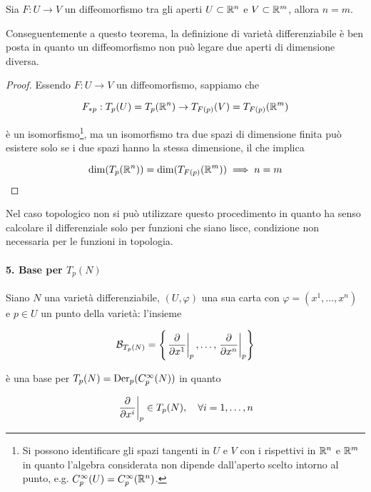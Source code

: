\begin{theorem}
	Sia $ F : U \to V $ un diffeomorfismo tra gli aperti $ U \subset \mathbb{R}^{n} $ e $ V \subset \mathbb{R}^{m} $, allora $ n = m $.
\end{theorem}

Conseguentemente a questo teorema, la definizione di varietà differenziabile è ben posta in quanto un diffeomorfismo non può legare due aperti di dimensione diversa.

\begin{proof}
	Essendo $ F : U \to V $ un diffeomorfismo, sappiamo che
	
	\begin{equation}
		F_{*p} : T_{p}(U) = T_{p}(\mathbb{R}^{n}) \to T_{F(p)}(V) = T_{F(p)}(\mathbb{R}^{m})
	\end{equation}

	è un isomorfismo\footnote{%
		Si possono identificare gli spazi tangenti in $ U $ e $ V $ con i rispettivi in $ \mathbb{R}^{n} $ e $ \mathbb{R}^{m} $ in quanto l'algebra considerata non dipende dall'aperto scelto intorno al punto, e.g. $ C_{p}^{\infty}(U) = C_{p}^{\infty}(\mathbb{R}^{n}) $.%
	}, ma un isomorfismo tra due spazi di dimensione finita può esistere solo se i due spazi hanno la stessa dimensione, il che implica
	
	\begin{equation}
		\dim(T_{p}(\mathbb{R}^{n})) = \dim(T_{F(p)}(\mathbb{R}^{m})) \implies n = m
	\end{equation}
\end{proof}

Nel caso topologico non si può utilizzare questo procedimento in quanto ha senso calcolare il differenziale solo per funzioni che siano lisce, condizione non necessaria per le funzioni in topologia.

\paragraph{5. Base per $ T_{p}(N) $}

Siano $ N $ una varietà differenziabile, $ (U,\varphi) $ una sua carta con $ \varphi = (x^{1},\dots,x^{n}) $ e $ p \in U $ un punto della varietà: l'insieme

\begin{equation}
	\B_{T_{p}(N)} = \left\{ \eval{ \pdv{x^{1}} }_{p}, \dots, \eval{ \pdv{x^{n}} }_{p} \right\}
\end{equation}

è una base per $ T_{p}(N) = \operatorname{Der}_{p}(C_{p}^{\infty}(N)) $ in quanto

\begin{equation}
	\eval{ \pdv{x^{i}} }_{p} \in T_{p}(N) \qcomma \forall i=1,\dots,n
\end{equation}

